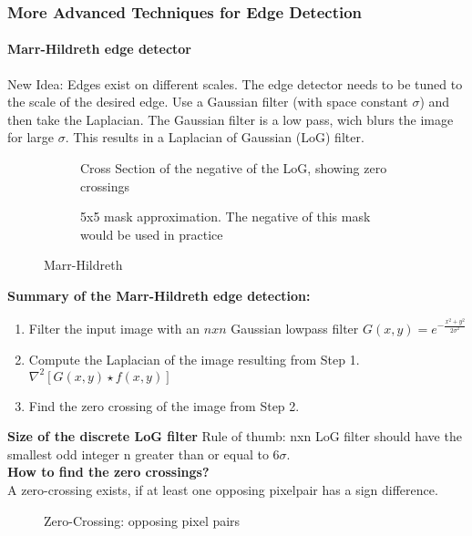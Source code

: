 \subsubsection{More Advanced Techniques for Edge Detection}
\paragraph{Marr-Hildreth edge detector}
New Idea: Edges exist on different scales. The edge detector needs to be tuned to the scale of the desired edge. Use a Gaussian filter (with space constant $\sigma$) and then take the Laplacian. The Gaussian filter is a low pass, wich blurs the image for large $\sigma$. This results in a Laplacian of Gaussian (LoG) filter.
\begin{figure}[h]
	\centering
	\begin{subfigure}[b]{0.45\textwidth}
		\centering
		\caption{Cross Section of the negative of the LoG, showing zero crossings}
	\end{subfigure}
	\begin{subfigure}[b]{0.45\textwidth}
		\centering
		\caption{5x5 mask approximation. The negative of this mask would be used in practice}
	\end{subfigure}
	\caption{Marr-Hildreth}
\end{figure}

\textbf{Summary of the Marr-Hildreth edge detection:}
\begin{enumerate}
\item Filter the input image with an $n x n$ Gaussian lowpass filter $G(x,y)=e^{-\frac{x^2+y^2}{2\sigma^2}}$
\item Compute the Laplacian of the image resulting from Step 1. $\nabla ^2[G(x,y) \star f(x,y)]$
\item Find the zero crossing of the image from Step 2.
\end{enumerate}
\textbf{Size of the discrete LoG filter}
Rule of thumb: nxn LoG filter should have the smallest odd integer n greater than or equal to $6\sigma$.\\
\textbf{How to find the zero crossings?}\\
A zero-crossing exists, if at least one opposing pixelpair has a sign difference.
\begin{figure}[!h]
	\centering
	\caption{Zero-Crossing: opposing pixel pairs}	
\end{figure}

